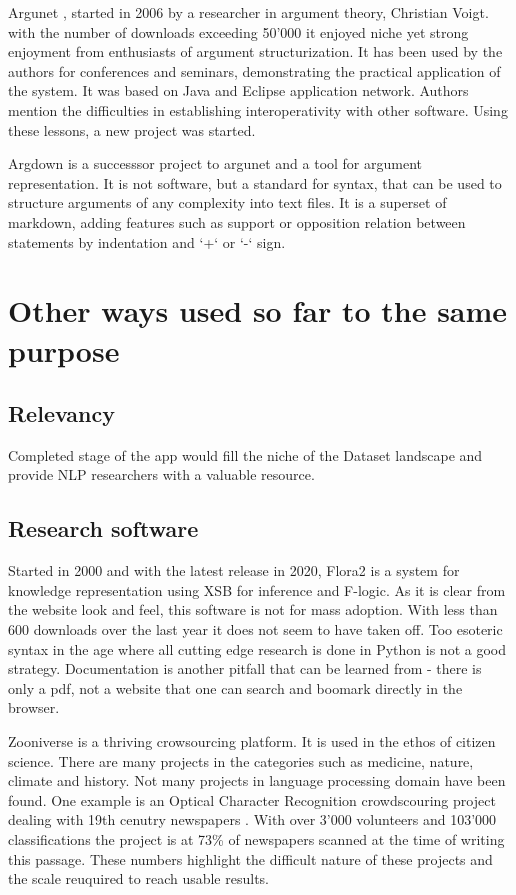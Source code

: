 \documentclass{report}
\begin{document}
{Argunet \cite{noauthor_argunet_2018}, started in 2006 by a researcher in argument theory, Christian Voigt. with the number of downloads exceeding 50'000 it enjoyed niche yet strong enjoyment from enthusiasts of argument structurization. It has been used by the authors for conferences and seminars, demonstrating the practical application of the system. It was based on Java and Eclipse application network. Authors mention the difficulties in establishing interoperativity with other software. Using these lessons, a new project was started.

Argdown \cite{noauthor_argdown_nodate} is a successsor project to argunet and a tool for argument representation. It is not software, but a standard for syntax, that can be used to structure arguments of any complexity into text files. It is a superset of markdown, adding features such as support or opposition relation between statements by indentation and `+` or `-` sign.

\section{Other ways used so far to the same purpose}

\subsection{Relevancy}
Completed stage of the app would fill the niche of the Dataset landscape and provide NLP researchers with a valuable resource.

\subsection{Research software}

Started in 2000 and with the latest release in 2020,
Flora2 \cite{noauthor_flora-2_nodate} is a system for knowledge representation using XSB for inference and F-logic.
As it is clear from the website look and feel, this software is not for mass adoption.
With less than 600 downloads over the last year \cite{noauthor_flora-2_nodate-4} it does not seem to have taken off.
Too esoteric syntax in the age where all cutting edge research is done in Python is not a good strategy. Documentation is another pitfall that can be learned from - there is only a pdf, not a website that one can search and boomark directly in the browser. 

Zooniverse \cite{noauthor_zooniverse_nodate} is a thriving crowsourcing platform. It is used in the ethos of citizen science. There are many projects in the categories such as medicine, nature, climate and history.  Not many projects in language processing domain have been found. One example is an Optical Character Recognition crowdscouring project dealing with 19th cenutry newspapers \cite{noauthor_zooniverse_nodate-1}. With over 3'000 volunteers and 103'000 classifications the project is at 73\% of newspapers scanned at the time of writing this passage.
These numbers highlight the difficult nature of these projects and the scale reuquired to reach usable results.

}
\end{document}
